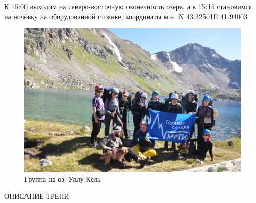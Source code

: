 К 15:00 выходим на северо-восточную оконечность озера, а в 15:15 становимся на ночёвку на оборудованной стоянке, координаты м.н. N 43.32501\degree E 41.94003\degree

\begin{figure}[h]
	\centering
	\includegraphics[width=0.7\linewidth]{../pics/DSC_0800}
	\caption{Группа на оз. Уллу-Кёль}
	\label{fig:DSC_0800}
\end{figure}



ОПИСАНИЕ ТРЕНИ
\newpage